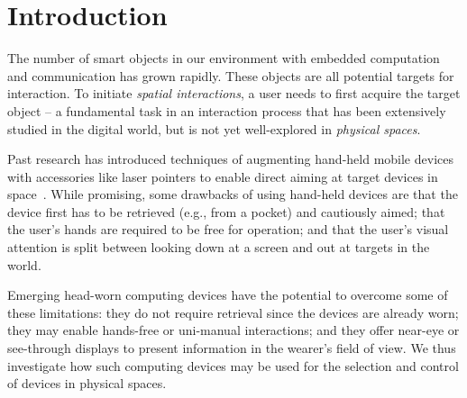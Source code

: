 \section{Introduction}

The number of smart objects in our environment with embedded computation and communication has grown rapidly. These objects are all potential targets for interaction. To initiate {\em spatial interactions}, a user needs to first acquire the target object -- a fundamental task in an interaction process that has been extensively studied in the digital world, but is not yet well-explored in {\em physical spaces}.

Past research has introduced techniques of augmenting hand-held mobile devices with accessories like laser pointers to enable direct aiming at target devices in space~\cite{beigl_point_1999,patel_2-way_2003}. While promising, some drawbacks of using hand-held devices are that the device first has to be retrieved (e.g., from a pocket) and cautiously aimed; that the user's hands are required to be free for operation; and that the user's visual attention is split between looking down at a screen and out at targets in the world. 



Emerging head-worn computing devices have the potential to overcome some of these limitations: they do not require retrieval since the devices are already worn; they may enable hands-free or uni-manual interactions; and they offer near-eye or see-through displays to present information in the wearer's field of view. We thus investigate how such computing devices may be used for the selection and control of devices in physical spaces.

